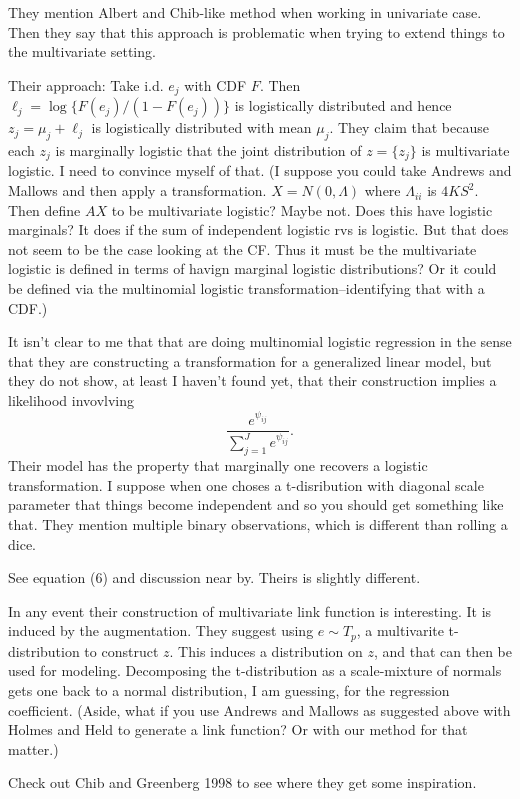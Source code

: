 \documentclass{article}
\begin{document}
They mention Albert and Chib-like method when working in univariate case.  Then
they say that this approach is problematic when trying to extend things to the
multivariate setting.

Their approach: Take i.d. $e_j$ with CDF $F$.  Then $\ell_j = \log \{ F(e_j) /
(1 - F(e_j)) \}$ is logistically distributed and hence $z_j = \mu_j + \ell_j$ is
logistically distributed with mean $\mu_j$.  They claim that because each $z_j$
is marginally logistic that the joint distribution of $z = \{z_j\}$ is
multivariate logistic.  I need to convince myself of that.  (I suppose you could
take Andrews and Mallows and then apply a transformation.  $X = N(0, \Lambda)$
where $\Lambda_{ii}$ is $4KS^2$.  Then define $AX$ to be multivariate logistic?
Maybe not.  Does this have logistic marginals?  It does if the sum of
independent logistic rvs is logistic.  But that does not seem to be the case
looking at the CF.  Thus it must be the multivariate logistic is defined in
terms of havign marginal logistic distributions?  Or it could be defined via the
multinomial logistic transformation--identifying that with a CDF.)

It isn't clear to me that that are doing multinomial logistic regression in the
sense that they are constructing a transformation for a generalized linear
model, but they do not show, at least I haven't found yet, that their
construction implies a likelihood invovlving
\[
\frac{e^{\psi_{ij}}}{\sum_{j=1}^J e^{\psi_{ij}}}.
\] 
Their model has the property that marginally one recovers a logistic
transformation.  I suppose when one choses a t-disribution with diagonal scale
parameter that things become independent and so you should get something like
that.  They mention multiple binary observations, which is different than
rolling a dice.

See equation (6) and discussion near by.  Theirs is slightly different.

In any event their construction of multivariate link function is interesting.
It is induced by the augmentation.  They suggest using $e \sim T_p$, a
multivarite t-distribution to construct $z$.  This induces a distribution on
$z$, and that can then be used for modeling.  Decomposing the t-distribution as
a scale-mixture of normals gets one back to a normal distribution, I am
guessing, for the regression coefficient.  (Aside, what if you use Andrews and
Mallows as suggested above with Holmes and Held to generate a link function?  Or
with our method for that matter.)

Check out Chib and Greenberg 1998 to see where they get some inspiration.
\end{document}
